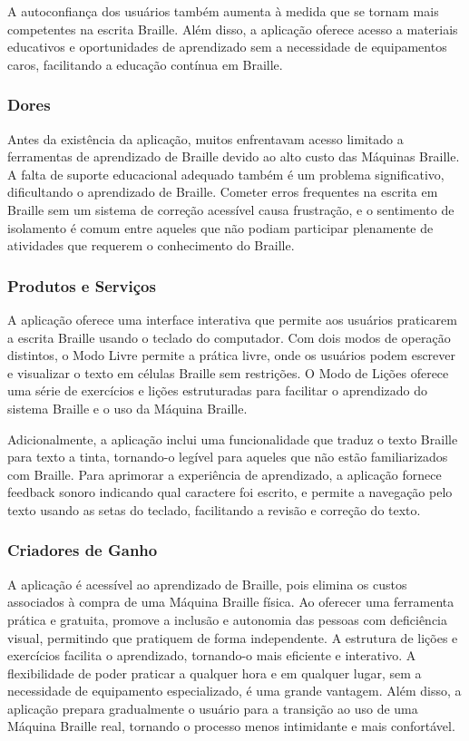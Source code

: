 A autoconfiança dos usuários também aumenta à medida que se tornam mais competentes na escrita Braille. Além disso, a aplicação oferece acesso a materiais educativos e oportunidades de aprendizado sem a necessidade de equipamentos caros, facilitando a educação contínua em Braille.

\subsubsection{Dores}

Antes da existência da aplicação, muitos enfrentavam acesso limitado a ferramentas de aprendizado de Braille devido ao alto custo das Máquinas Braille. A falta de suporte educacional adequado também é um problema significativo, dificultando o aprendizado de Braille. Cometer erros frequentes na escrita em Braille sem um sistema de correção acessível causa frustração, e o sentimento de isolamento é comum entre aqueles que não podiam participar plenamente de atividades que requerem o conhecimento do Braille.

\subsubsection{Produtos e Serviços}

A aplicação oferece uma interface interativa que permite aos usuários praticarem a escrita Braille usando o teclado do computador. Com dois modos de operação distintos, o Modo Livre permite a prática livre, onde os usuários podem escrever e visualizar o texto em células Braille sem restrições. O Modo de Lições oferece uma série de exercícios e lições estruturadas para facilitar o aprendizado do sistema Braille e o uso da Máquina Braille. 

Adicionalmente, a aplicação inclui uma funcionalidade que traduz o texto Braille para texto a tinta, tornando-o legível para aqueles que não estão familiarizados com Braille. Para aprimorar a experiência de aprendizado, a aplicação fornece feedback sonoro indicando qual caractere foi escrito, e permite a navegação pelo texto usando as setas do teclado, facilitando a revisão e correção do texto.

\subsubsection{Criadores de Ganho}

A aplicação é acessível ao aprendizado de Braille, pois elimina os custos associados à compra de uma Máquina Braille física. Ao oferecer uma ferramenta prática e gratuita, promove a inclusão e autonomia das pessoas com deficiência visual, permitindo que pratiquem de forma independente. A estrutura de lições e exercícios facilita o aprendizado, tornando-o mais eficiente e interativo. A flexibilidade de poder praticar a qualquer hora e em qualquer lugar, sem a necessidade de equipamento especializado, é uma grande vantagem. Além disso, a aplicação prepara gradualmente o usuário para a transição ao uso de uma Máquina Braille real, tornando o processo menos intimidante e mais confortável.

